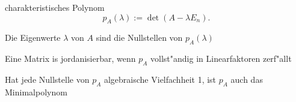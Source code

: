 \documentclass[class=article, crop=false]{standalone}
\begin{document}
\begin{zettel}{charakteristisches Polynom}
\[
    p_{A}(\lambda ) := \det(A - \lambda E_{n})
.\]

Die Eigenwerte $\lambda$ von $A$ sind die Nullstellen von $p_{A}(\lambda)$ 

Eine Matrix is jordanisierbar, wenn $p_{A}$ vollst"andig in Linearfaktoren zerf"allt

Hat jede Nullstelle von $p_{A}$ algebraische Vielfachheit 1, ist $p_{A}$ auch das Minimalpolynom
\end{zettel}
\end{document}
